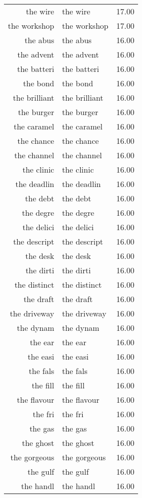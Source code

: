 \begin{table}[ht]
\begin{tabular}{rlr}
  the wire & the wire & 17.00 \\ 
  the workshop & the workshop & 17.00 \\ 
  the abus & the abus & 16.00 \\ 
  the advent & the advent & 16.00 \\ 
  the batteri & the batteri & 16.00 \\ 
  the bond & the bond & 16.00 \\ 
  the brilliant & the brilliant & 16.00 \\ 
  the burger & the burger & 16.00 \\ 
  the caramel & the caramel & 16.00 \\ 
  the chance & the chance & 16.00 \\ 
  the channel & the channel & 16.00 \\ 
  the clinic & the clinic & 16.00 \\ 
  the deadlin & the deadlin & 16.00 \\ 
  the debt & the debt & 16.00 \\ 
  the degre & the degre & 16.00 \\ 
  the delici & the delici & 16.00 \\ 
  the descript & the descript & 16.00 \\ 
  the desk & the desk & 16.00 \\ 
  the dirti & the dirti & 16.00 \\ 
  the distinct & the distinct & 16.00 \\ 
  the draft & the draft & 16.00 \\ 
  the driveway & the driveway & 16.00 \\ 
  the dynam & the dynam & 16.00 \\ 
  the ear & the ear & 16.00 \\ 
  the easi & the easi & 16.00 \\ 
  the fals & the fals & 16.00 \\ 
  the fill & the fill & 16.00 \\ 
  the flavour & the flavour & 16.00 \\ 
  the fri & the fri & 16.00 \\ 
  the gas & the gas & 16.00 \\ 
  the ghost & the ghost & 16.00 \\ 
  the gorgeous & the gorgeous & 16.00 \\ 
  the gulf & the gulf & 16.00 \\ 
  the handl & the handl & 16.00 \\ 

\end{tabular}
\end{table}
